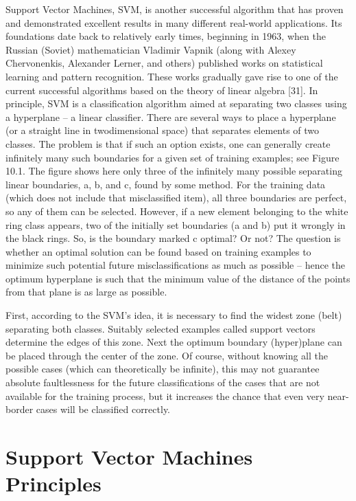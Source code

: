 \documentclass[11pt,openany,executivepaper]{book}
\begin{document}
Support Vector Machines, SVM, is another successful algorithm that has proven
and demonstrated excellent results in many different real-world applications. Its
foundations date back to relatively early times, beginning in 1963, when the Russian (Soviet) mathematician Vladimir Vapnik (along with Alexey Chervonenkis,
Alexander Lerner, and others) published works on statistical learning and pattern
recognition.
These works gradually gave rise to one of the current successful algorithms
based on the theory of linear algebra [31]. In principle, SVM is a classification
algorithm aimed at separating two classes using a hyperplane – a linear classifier. There are several ways to place a hyperplane (or a straight line in twodimensional space) that separates elements of two classes. The problem is that if
such an option exists, one can generally create infinitely many such boundaries
for a given set of training examples; see Figure 10.1.
The figure shows here only three of the infinitely many possible separating
linear boundaries, a, b, and c, found by some method. For the training data
(which does not include that misclassified item), all three boundaries are perfect, so any of them can be selected. However, if a new element belonging to
the white ring class appears, two of the initially set boundaries (a and b) put it
wrongly in the black rings. So, is the boundary marked c optimal? Or not? The
question is whether an optimal solution can be found based on training examples
to minimize such potential future misclassifications as much as possible – hence
the optimum hyperplane is such that the minimum value of the distance of the
points from that plane is as large as possible.

First, according to the SVM’s idea, it is necessary to find the widest zone
(belt) separating both classes. Suitably selected examples called support vectors
determine the edges of this zone.
Next the optimum boundary (hyper)plane can be placed through the center
of the zone. Of course, without knowing all the possible cases (which can theoretically be infinite), this may not guarantee absolute faultlessness for the future
classifications of the cases that are not available for the training process, but it
increases the chance that even very near-border cases will be classified correctly.

\section{Support Vector Machines Principles}
\end{document}
